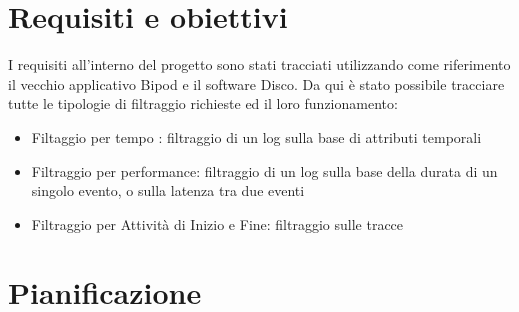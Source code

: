 \section{Requisiti e obiettivi}
I requisiti all'interno del progetto sono stati tracciati utilizzando come riferimento il vecchio applicativo Bipod e il software Disco. Da qui è stato possibile tracciare tutte le tipologie di filtraggio richieste ed il loro funzionamento:
\begin{itemize}
	\item Filtaggio per tempo : filtraggio di un log sulla base di attributi temporali
	\item Filtraggio per performance: filtraggio di un log sulla base della durata di un singolo evento, o sulla latenza tra due eventi
	\item Filtraggio per Attività di Inizio e Fine: filtraggio sulle tracce
\end{itemize}

\section{Pianificazione}